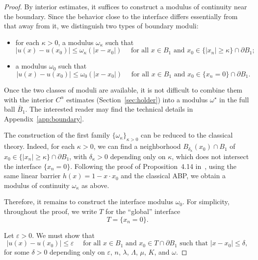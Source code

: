 \documentclass[letter,11pt]{amsart}
\newcommand{\vep}{\varepsilon}
\theoremstyle{definition}
\numberwithin{equation}{section}
\begin{document}
\begin{proof}
By interior estimates, it suffices to construct a modulus of continuity near the boundary. 
Since the behavior close to the interface differs essentially from that away from it, we distinguish two types of boundary moduli:
\begin{itemize}
\item for each $\kappa > 0$, a modulus $\omega_\kappa$ such that
\[
|u(x) - u(x_0)| \leq \omega_{\kappa}(|x-x_0|) \quad \text{ for all } x \in B_1 \text{ and } x_0 \in 
\{|x_n| \geq \kappa\} \cap \partial B_1;
\]
\item a modulus $\omega_0$ such that
\[
|u(x) - u(x_0)| \leq \omega_0(|x-x_0|) \quad \text{ for all } x \in B_1 \text{ and } x_0 \in \{x_n = 0\} \cap \partial B_1.
\]
\end{itemize}
Once the two classes of moduli are available, it is not difficult to combine them with the interior $C^{\alpha}$ estimates (Section~\ref{sec:holder}) into a modulus $\omega^{\star}$ in the full ball $\overline{B}_1$.
The interested reader may find the technical details in Appendix~\ref{app:boundary}.

\medskip

The construction of the first family $\{\omega_{\kappa}\}_{\kappa > 0}$ can be reduced to the classical theory.
Indeed, for each $\kappa > 0$, we can find a neighborhood $B_{\delta_{\kappa}}(x_0) \cap B_1$ of $x_0 \in \{|x_n| \geq \kappa\} \cap \partial B_1$, with $\delta_{\kappa}> 0$ depending only on $\kappa$, which does not intersect the interface $\{x_n = 0\}$.
Following the proof of Proposition~4.14 in~\cite{CC}, using the same linear barrier $h(x) = 1 - x \cdot x_0$ and the classical ABP, 
we obtain a modulus of continuity $\omega_{\kappa}$ as above.

\medskip

Therefore, it remains to construct the interface modulus $\omega_0$.
For simplicity, throughout the proof, we write $T$ for the ``global'' interface
\[
T = \{x_n = 0\}.
\]

\medskip

Let $\vep >0$.
We must show that 
\begin{equation}
\label{anima}
|u(x) - u(x_0)| \leq \vep \quad \text{ for all } x \in B_1 \text{ and } x_0 \in T \cap \partial B_1
\text{ such that } |x-x_0| \leq \delta,
\end{equation}
for some $\delta > 0$ depending only on $\vep$, $n$, $\lambda$, $\Lambda$, $\mu$, $K$, and $\omega$.

\medskip


\end{proof}
\end{document}
